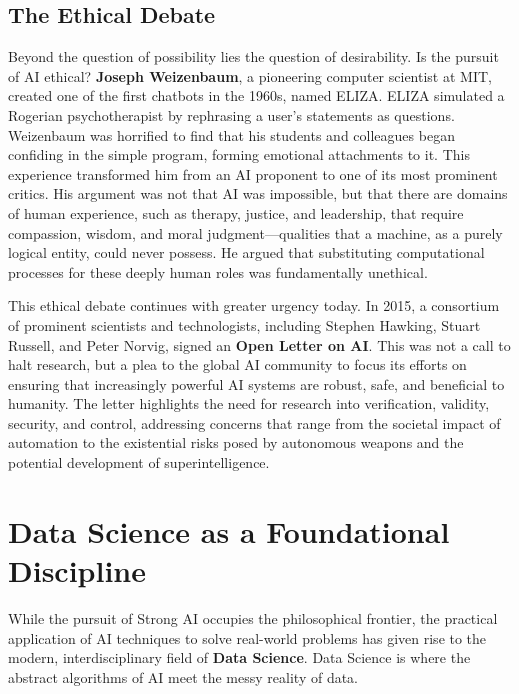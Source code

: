 \subsection*{The Ethical Debate}
Beyond the question of possibility lies the question of desirability. Is the pursuit of AI ethical? \textbf{Joseph Weizenbaum}, a pioneering computer scientist at MIT, created one of the first chatbots in the 1960s, named ELIZA. ELIZA simulated a Rogerian psychotherapist by rephrasing a user's statements as questions. Weizenbaum was horrified to find that his students and colleagues began confiding in the simple program, forming emotional attachments to it. This experience transformed him from an AI proponent to one of its most prominent critics. His argument was not that AI was impossible, but that there are domains of human experience, such as therapy, justice, and leadership, that require compassion, wisdom, and moral judgment—qualities that a machine, as a purely logical entity, could never possess. He argued that substituting computational processes for these deeply human roles was fundamentally unethical.

This ethical debate continues with greater urgency today. In 2015, a consortium of prominent scientists and technologists, including Stephen Hawking, Stuart Russell, and Peter Norvig, signed an \textbf{Open Letter on AI}. This was not a call to halt research, but a plea to the global AI community to focus its efforts on ensuring that increasingly powerful AI systems are robust, safe, and beneficial to humanity. The letter highlights the need for research into verification, validity, security, and control, addressing concerns that range from the societal impact of automation to the existential risks posed by autonomous weapons and the potential development of superintelligence.

\section{Data Science as a Foundational Discipline}
\label{sec:data_science_discipline}
While the pursuit of Strong AI occupies the philosophical frontier, the practical application of AI techniques to solve real-world problems has given rise to the modern, interdisciplinary field of \textbf{Data Science}. Data Science is where the abstract algorithms of AI meet the messy reality of data.

